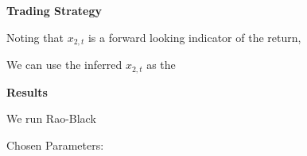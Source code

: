 \documentclass[../main.tex]{subfiles}
\begin{document}
\textbf{Trading Strategy}

Noting that $x_{2,t}$ is a forward looking indicator of the return, 


We can use the inferred $x_{2,t}$ as the 


\textbf{Results}

We run Rao-Black


Chosen Parameters:
\end{document}
